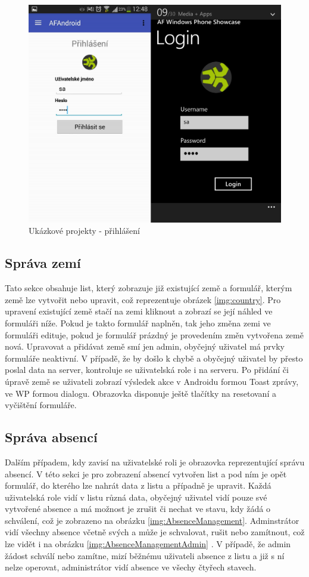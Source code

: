 \begin{figure}[h!]
\centering
\includegraphics[width=0.7\linewidth]{figures/screenshots/Login}
\caption{Ukázkové projekty - přihlášení}  
\label{img:login}
\end{figure}

\subsection{Správa zemí}
Tato sekce obsahuje list, který zobrazuje již existující země a formulář, kterým země lze vytvořit nebo upravit, což reprezentuje obrázek \ref{img:country}. Pro upravení existující země stačí na zemi kliknout a zobrazí se její náhled ve formuláři níže. Pokud je takto formulář naplněn, tak jeho změna zemi ve formuláři edituje, pokud je formulář prázdný je provedením změn vytvořena země nová. Upravovat a přidávat země smí jen admin, obyčejný uživatel má prvky formuláře neaktivní. V případě, že by došlo k chybě a obyčejný uživatel by přesto poslal data na server, kontroluje se uživatelská role i na serveru. Po přidání či úpravě země se uživateli zobrazí výsledek akce v Androidu formou Toast zprávy, ve WP formou dialogu. Obrazovka disponuje ještě tlačítky na resetovaní a vyčištění formuláře.
\subsection{Správa absencí}
Dalším případem, kdy zavisí na uživatelské roli je obrazovka reprezentující správu absencí. V této sekci je pro zobrazení absencí vytvořen list a pod ním je opět formulář, do kterého lze nahrát data z listu a případně je upravit. Každá uživatelská role vidí v listu různá data, obyčejný uživatel vidí pouze své vytvořené absence a má možnost je zrušit či nechat ve stavu, kdy žádá o schválení, což je zobrazeno na obrázku \ref{img:AbsenceManagement}. Adminstrátor vidí všechny absence včetně svých a může je schvalovat, rušit nebo zamítnout, což lze vidět i na obrázku \ref{img:AbsenceManagementAdmin} . V případě, že admin žádost schválí nebo zamítne, mizí běžnému uživateli absence z listu a již s ní nelze operovat, administrátor vidí absence ve všechy čtyřech stavech. 

